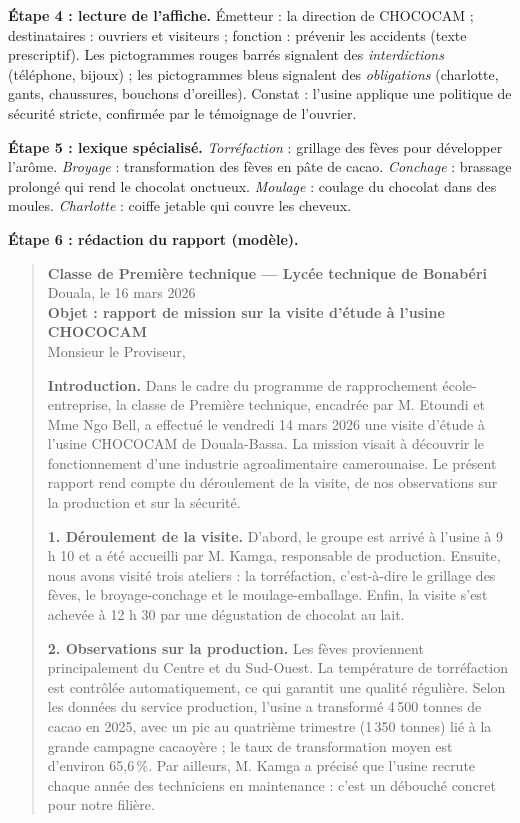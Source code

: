 \documentclass[11pt]{article}
\begin{document}
\begin{exoresolu}
\textbf{Étape 4 : lecture de l'affiche.} Émetteur : la direction de CHOCOCAM ; destinataires : ouvriers et visiteurs ; fonction : prévenir les accidents (texte prescriptif). Les pictogrammes rouges barrés signalent des \emph{interdictions} (téléphone, bijoux) ; les pictogrammes bleus signalent des \emph{obligations} (charlotte, gants, chaussures, bouchons d'oreilles). Constat : l'usine applique une politique de sécurité stricte, confirmée par le témoignage de l'ouvrier.

\textbf{Étape 5 : lexique spécialisé.} \emph{Torréfaction} : grillage des fèves pour développer l'arôme. \emph{Broyage} : transformation des fèves en pâte de cacao. \emph{Conchage} : brassage prolongé qui rend le chocolat onctueux. \emph{Moulage} : coulage du chocolat dans des moules. \emph{Charlotte} : coiffe jetable qui couvre les cheveux.

\textbf{Étape 6 : rédaction du rapport (modèle).}

\begin{quote}
\textbf{Classe de Première technique — Lycée technique de Bonabéri}\\
Douala, le 16 mars 2026\\
\textbf{Objet : rapport de mission sur la visite d'étude à l'usine CHOCOCAM}\\
Monsieur le Proviseur,

\textbf{Introduction.} Dans le cadre du programme de rapprochement école-entreprise, la classe de Première technique, encadrée par M. Etoundi et Mme Ngo Bell, a effectué le vendredi 14 mars 2026 une visite d'étude à l'usine CHOCOCAM de Douala-Bassa. La mission visait à découvrir le fonctionnement d'une industrie agroalimentaire camerounaise. Le présent rapport rend compte du déroulement de la visite, de nos observations sur la production et sur la sécurité.

\textbf{1. Déroulement de la visite.} D'abord, le groupe est arrivé à l'usine à 9 h 10 et a été accueilli par M. Kamga, responsable de production. Ensuite, nous avons visité trois ateliers : la torréfaction, c'est-à-dire le grillage des fèves, le broyage-conchage et le moulage-emballage. Enfin, la visite s'est achevée à 12 h 30 par une dégustation de chocolat au lait.

\textbf{2. Observations sur la production.} Les fèves proviennent principalement du Centre et du Sud-Ouest. La température de torréfaction est contrôlée automatiquement, ce qui garantit une qualité régulière. Selon les données du service production, l'usine a transformé 4\,500 tonnes de cacao en 2025, avec un pic au quatrième trimestre (1\,350 tonnes) lié à la grande campagne cacaoyère ; le taux de transformation moyen est d'environ 65,6\,\%. Par ailleurs, M. Kamga a précisé que l'usine recrute chaque année des techniciens en maintenance : c'est un débouché concret pour notre filière.


\end{quote}
\end{exoresolu}
\end{document}
